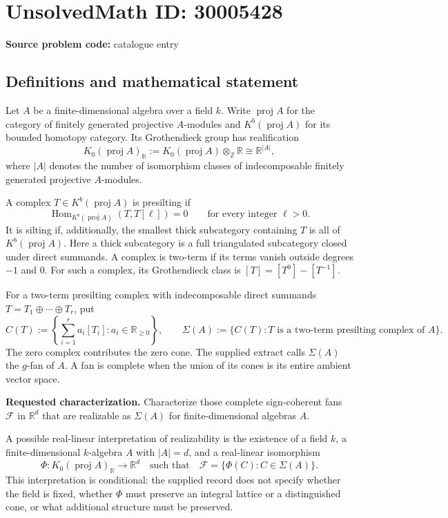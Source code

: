 \documentclass[11pt]{article}
\newcommand{\Z}{\mathbb{Z}}
\newcommand{\R}{\mathbb{R}}
\begin{document}
\section*{UnsolvedMath ID: 30005428}
\textbf{Source problem code:} catalogue entry
\subsection{Definitions and mathematical statement}
Let \(A\) be a finite-dimensional algebra over a field \(k\). Write \(\operatorname{proj}A\) for the category of finitely generated projective \(A\)-modules and \(K^b(\operatorname{proj}A)\) for its bounded homotopy category. Its Grothendieck group has realification
\[
K_0(\operatorname{proj}A)_{\R}:=K_0(\operatorname{proj}A)\otimes_{\Z}\R\cong\R^{|A|},
\]
where \(|A|\) denotes the number of isomorphism classes of indecomposable finitely generated projective \(A\)-modules.

A complex \(T\in K^b(\operatorname{proj}A)\) is presilting if
\[
\operatorname{Hom}_{K^b(\operatorname{proj}A)}(T,T[\ell])=0
\qquad\text{for every integer }\ell>0.
\]
It is silting if, additionally, the smallest thick subcategory containing \(T\) is all of \(K^b(\operatorname{proj}A)\). Here a thick subcategory is a full triangulated subcategory closed under direct summands. A complex is two-term if its terms vanish outside degrees \(-1\) and \(0\). For such a complex, its Grothendieck class is \([T]=[T^0]-[T^{-1}]\).

For a two-term presilting complex with indecomposable direct summands \(T=T_1\oplus\cdots\oplus T_r\), put
\[
C(T):=\left\{\sum_{i=1}^{r}a_i[T_i]:a_i\in\R_{\geq0}\right\},
\qquad
\Sigma(A):=\{C(T):T\text{ is a two-term presilting complex of }A\}.
\]
The zero complex contributes the zero cone. The supplied extract calls \(\Sigma(A)\) the \(g\)-fan of \(A\). A fan is complete when the union of its cones is its entire ambient vector space.

\textbf{Requested characterization.} Characterize those complete sign-coherent fans \(\mathcal F\) in \(\R^d\) that are realizable as \(\Sigma(A)\) for finite-dimensional algebras \(A\).

A possible real-linear interpretation of realizability is the existence of a field \(k\), a finite-dimensional \(k\)-algebra \(A\) with \(|A|=d\), and a real-linear isomorphism
\[
\Phi:K_0(\operatorname{proj}A)_{\R}\longrightarrow\R^d
\quad\text{such that}\quad
\mathcal F=\{\Phi(C):C\in\Sigma(A)\}.
\]
This interpretation is conditional: the supplied record does not specify whether the field is fixed, whether \(\Phi\) must preserve an integral lattice or a distinguished cone, or what additional structure must be preserved.
\end{document}
